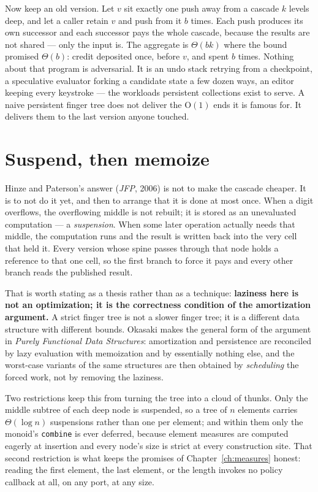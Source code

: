 \documentclass[11pt,twoside,openright]{book}
\newcommand{\code}[1]{\texorpdfstring{\textcolor{d7ink}{\texttt{#1}}}{#1}}
\newcommand{\term}[1]{\textit{#1}}
\newcommand{\bigoh}[1]{$\mathrm{O}(#1)$}
\begin{document}
Now keep an old version. Let $v$ sit exactly one push away from a cascade $k$
levels deep, and let a caller retain $v$ and push from it $b$ times. Each push
produces its own successor and each successor pays the whole cascade, because
the results are not shared --- only the input is. The aggregate is $\Theta(bk)$
where the bound promised $\Theta(b)$: credit deposited once, before $v$, and
spent $b$ times. Nothing about that
program is adversarial. It is an undo stack retrying from a checkpoint, a
speculative evaluator forking a candidate state a few dozen ways, an editor
keeping every keystroke --- the workloads persistent collections exist to serve.
A naive persistent finger tree does not deliver the \bigoh{1} ends it is famous
for. It delivers them to the last version anyone touched.

\section{Suspend, then memoize}

Hinze and Paterson's answer (\textit{JFP}, 2006) is not to make the cascade
cheaper. It is to not do it yet, and then to arrange that it is done at most
once. When a digit overflows, the overflowing middle is not rebuilt; it is
stored as an unevaluated computation --- a \term{suspension}. When some later
operation actually needs that middle, the computation runs and the result is
written back into the very cell that held it. Every version whose spine passes
through that node holds a reference to that one cell, so the first branch to
force it pays and every other branch reads the published result.

That is worth stating as a thesis rather than as a technique:
\textbf{laziness here is not an optimization; it is the correctness condition of
the amortization argument.} A strict finger tree is not a slower finger tree; it
is a different data structure with different bounds. Okasaki makes the general
form of the argument in \textit{Purely Functional Data Structures}: amortization
and persistence are reconciled by lazy evaluation with memoization and by
essentially nothing else, and the worst-case variants of the same structures are
then obtained by \emph{scheduling} the forced work, not by removing the
laziness.

Two restrictions keep this from turning the tree into a cloud of thunks. Only
the middle subtree of each deep node is suspended, so a tree of $n$ elements
carries $\Theta(\log n)$ suspensions rather than one per element; and within
them only the monoid's \code{combine} is ever deferred, because element measures
are computed eagerly at insertion and every node's size is strict at every
construction site. That second restriction is what keeps the promises of
Chapter~\ref{ch:measures} honest: reading the first element, the last element,
or the length invokes no policy callback at all, on any port, at any size.
\end{document}
